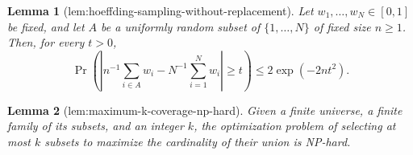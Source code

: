 \documentclass{article}
\newtheorem{lemma}{Lemma}
\begin{document}
\begin{lemma}[lem:hoeffding-sampling-without-replacement]\label{lem:hoeffding-sampling-without-replacement}
Let \(w_1,\ldots,w_N\in[0,1]\) be fixed, and let \(A\) be a uniformly random subset of \(\{1,\ldots,N\}\) of fixed size \(n\geq1\).  Then, for every \(t>0\),
\[
\Pr\!\left(\left|n^{-1}\sum_{i\in A}w_i-N^{-1}\sum_{i=1}^Nw_i\right|\geq t\right)
\leq2\exp(-2nt^2).
\]
\end{lemma}

\begin{lemma}[lem:maximum-k-coverage-np-hard]\label{lem:maximum-k-coverage-np-hard}
Given a finite universe, a finite family of its subsets, and an integer \(k\), the optimization problem of selecting at most \(k\) subsets to maximize the cardinality of their union is NP-hard.
\end{lemma}
\end{document}
